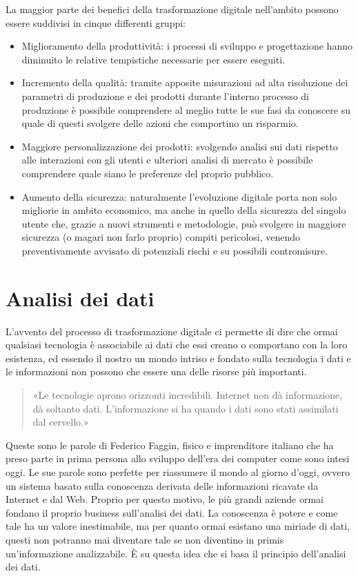 La maggior parte dei benefici della trasformazione digitale nell'ambito possono essere suddivisi in cinque differenti gruppi:~\cite{sciencedirect_digital_transformation_benefits}
\begin{itemize}
    \item Miglioramento della produttività: i processi di sviluppo e progettazione hanno diminuito le relative tempistiche necessarie per essere eseguiti.
    \item Incremento della qualità: tramite apposite misurazioni ad alta risoluzione dei parametri di produzione e dei prodotti durante l'interno processo di produzione è possibile comprendere al meglio tutte le sue fasi da conoscere su quale di questi svolgere delle azioni che comportino un risparmio.
    \item Maggiore personalizzazione dei prodotti: svolgendo analisi sui dati rispetto alle interazioni con gli utenti e ulteriori analisi di mercato è possibile comprendere quale siano le preferenze del proprio pubblico.
    \item Aumento della sicurezza: naturalmente l’evoluzione digitale porta non solo migliorie in ambito economico, ma anche in quello della sicurezza del singolo utente che, grazie a nuovi strumenti e metodologie, può svolgere in maggiore sicurezza (o magari non farlo proprio) compiti pericolosi, venendo preventivamente avvisato di potenziali rischi e su possibili contromisure.
\end{itemize}

\section{Analisi dei dati}

L'avvento del processo di trasformazione digitale ci permette di dire che ormai qualsiasi tecnologia è associabile ai dati che essi creano o comportano con la loro esistenza, ed essendo il nostro un mondo intriso e fondato sulla tecnologia i dati e le informazioni non possono che essere una delle risorse più importanti.

\begin{quote}
    «Le tecnologie aprono orizzonti incredibili. Internet non dà informazione, dà soltanto dati. L'informazione si ha quando i dati sono stati assimilati dal cervello.»
\end{quote}

Queste sono le parole di Federico Faggin\cite{federico_faggin_cite}, fisico e imprenditore italiano che ha preso parte in prima persona allo sviluppo dell’era dei computer come sono intesi oggi. Le sue parole sono perfette per riassumere il mondo al giorno d’oggi, ovvero un sistema basato sulla conoscenza derivata delle informazioni ricavate da Internet e dal Web. Proprio per questo motivo, le più grandi aziende ormai fondano il proprio business sull’analisi dei dati. La conoscenza è potere e come tale ha un valore inestimabile, ma per quanto ormai esistano una miriade di dati, questi non potranno mai diventare tale se non diventino in primis un’informazione analizzabile. È su questa idea che si basa il principio dell'analisi dei dati.

